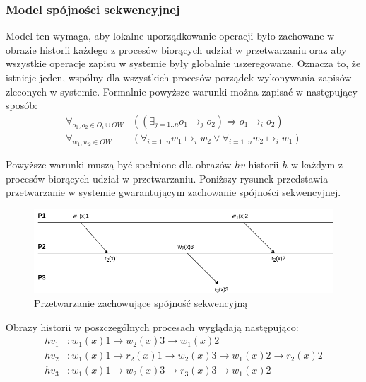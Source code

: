 \subsubsection{Model spójności sekwencyjnej}


Model ten wymaga, aby lokalne uporządkowanie operacji było zachowane w obrazie historii każdego z procesów biorących udział w przetwarzaniu oraz aby wszystkie operacje zapisu w systemie były globalnie uszeregowane. Oznacza to, że istnieje jeden, wspólny dla wszystkich procesów porządek wykonywania zapisów zleconych w systemie. Formalnie powyższe warunki można zapisać w następujący sposób:
\begin{align*}
    \forall_{o_1, o_2 \in O_i \cup OW} &(( \exists_{j = 1..n} o_1 \rightarrow_j o_2) \Rightarrow o_1 \mapsto_i o_2) \\
    \forall_{w_1, w_2 \in OW} &(\forall_{i = 1..n} w_1 \mapsto_i w_2 \vee \forall_{i = 1..n} w_2 \mapsto_i w_1)
\end{align*}

Powyższe warunki muszą być spełnione dla obrazów $ hv $ historii $ h $ w każdym z procesów biorących udział w przetwarzaniu. Poniższy rysunek przedstawia przetwarzanie w systemie gwarantującym zachowanie spójności sekwencyjnej.

\begin{figure}
    \includegraphics[width=\linewidth]{images/02-sequential.png}
    \caption{Przetwarzanie zachowujące spójność sekwencyjną}
    \label{figure:replication_sequential}
\end{figure}

Obrazy historii w poszczególnych procesach wyglądają następująco:
\begin{align*}
    hv_1&: w_1(x)1 \rightarrow w_2(x)3 \rightarrow w_1(x)2 \\
    hv_2&: w_1(x)1 \rightarrow r_2(x)1 \rightarrow w_2(x)3 \rightarrow w_1(x)2 \rightarrow r_2(x)2 \\
    hv_3&: w_1(x)1 \rightarrow w_2(x)3 \rightarrow r_3(x)3 \rightarrow w_1(x)2
\end{align*}

